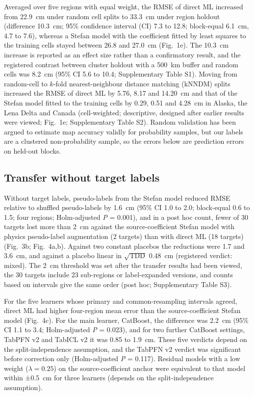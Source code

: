 Averaged over five regions with equal weight, the RMSE of direct ML increased from 22.9~cm under random cell splits to 33.3~cm under region holdout (difference 10.3~cm; 95\% confidence interval (CI) 7.3 to 12.8; block-equal 6.1~cm, 4.7 to 7.6), whereas a Stefan model with the coefficient fitted by least squares to the training cells stayed between 26.8 and 27.0~cm (Fig.~1e).
The 10.3~cm increase is reported as an effect size rather than a confirmatory result, and the registered contrast between cluster holdout with a 500~km buffer and random cells was 8.2~cm (95\% CI 5.6 to 10.4; Supplementary Table S1).
Moving from random-cell to $k$-fold nearest-neighbour distance matching (kNNDM) splits\cite{Linnenbrink2024} increased the RMSE of direct ML by 5.76, 8.17 and 14.20~cm and that of the Stefan model fitted to the training cells by 0.29, 0.51 and 4.28~cm in Alaska, the Lena Delta and Canada (cell-weighted; descriptive, designed after earlier results were viewed; Fig.~1e; Supplementary Table S2).
Random validation has been argued to estimate map accuracy validly for probability samples\cite{Wadoux2021}, but our labels are a clustered non-probability sample, so the errors below are prediction errors on held-out blocks.

\subsection{Transfer without target labels}\label{sec:results-label0}

Without target labels, pseudo-labels from the Stefan model reduced RMSE relative to shuffled pseudo-labels by 1.6~cm (95\% CI 1.0 to 2.0; block-equal 0.6 to 1.5; four regions; Holm-adjusted \textit{P} = 0.001), and in a post hoc count, fewer of 30 targets lost more than 2~cm against the source-coefficient Stefan model with physics pseudo-label augmentation (2 targets) than with direct ML (18 targets) (Fig.~3b; Fig.~4a,b).
Against two constant placebos the reductions were 1.7 and 3.6~cm, and against a placebo linear in $\sqrt{\mathrm{TDD}}$ 0.48~cm (registered verdict: mixed).
The 2~cm threshold was set after the transfer results had been viewed, the 30 targets include 23 sub-regions or label-expanded versions, and counts based on intervals give the same order (post hoc; Supplementary Table S3).

For the five learners whose primary and common-resampling intervals agreed, direct ML had higher four-region mean error than the source-coefficient Stefan model (Fig.~4c).
For the main learner, CatBoost, the difference was 2.2~cm (95\% CI 1.1 to 3.4; Holm-adjusted \textit{P} = 0.023), and for two further CatBoost settings, TabPFN v2 and TabICL v2 it was 0.85 to 1.9~cm.
These five verdicts depend on the split-independence assumption, and the TabPFN v2 verdict was significant before correction only (Holm-adjusted \textit{P} = 0.117).
Residual models with a low weight ($\lambda = 0.25$) on the source-coefficient anchor were equivalent to that model within ±0.5~cm for three learners (depends on the split-independence assumption).

